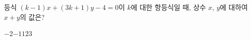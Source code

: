 등식 $(k-1)x+(3k+1)y-4=0$이 $k$에 대한 항등식일 때, 상수 $x$, $y$에 대하여 $x+y$의 값은?
\begin{choices32}{$-2$}{$-1$}{$1$}{$2$}{$3$}\end{choices32}
